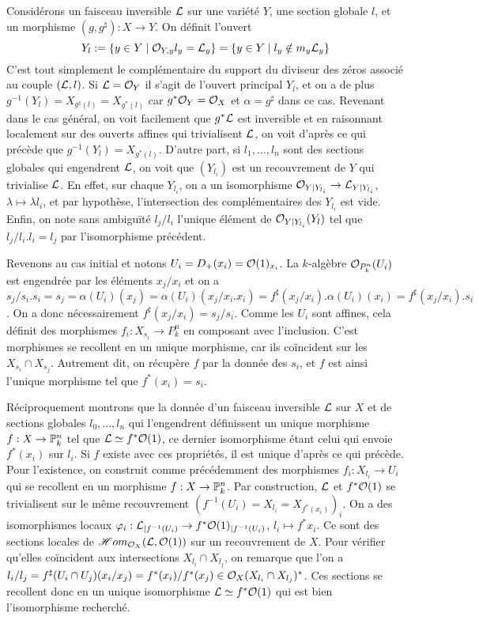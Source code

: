 Considérons un faisceau inversible $\mathcal{L}$ sur une variété $Y$, une section globale $l$, et un morphisme $(g,g^\sharp):X\rightarrow Y$. On définit l'ouvert 
$$Y_l:=\lbrace y\in Y\mid \mathcal{O}_{Y,y}l_y=\mathcal{L}_y\rbrace=\lbrace y\in Y\mid l_y\notin m_y\mathcal{L}_y\rbrace$$
C'est tout simplement le complémentaire du support du diviseur des zéros associé au couple $(\mathcal{L},l)$. Si $\mathcal{L}=\mathcal{O}_Y$ il s'agit de l'ouvert principal $Y_l$, et on a de plus $g^{-1}(Y_l)=X_{g^\sharp(l)}=X_{g^*(l)}$ car $g^*\mathcal{O}_Y=\mathcal{O}_X$ et $\alpha=g^\sharp$ dans ce cas. Revenant dans le cas général, on voit facilement que $g^*\mathcal{L}$ est inversible et en raisonnant localement sur des ouverts affines qui trivialisent $\mathcal{L}$, on voit d'après ce qui précède que $g^{-1}(Y_l)=X_{g^*(l)}$. D'autre part, si $l_1,...,l_n$ sont des sections globales qui engendrent $\mathcal{L}$, on voit que $(Y_{l_i})$ est un recouvrement de $Y$ qui trivialise $\mathcal{L}$. En effet, sur chaque $Y_{l_i}$, on a un isomorphisme $\mathcal{O}_{Y|Y_{l_i}}\rightarrow \mathcal{L}_{Y|Y_{l_i}}$, $\lambda \mapsto \lambda l_i$, et par hypothèse, l'intersection des complémentaires des $Y_{l_i}$ est vide. Enfin, on note sans ambiguïté $l_j/l_i$ l'unique élément de $\mathcal{O}_{Y|Y_{l_i}}(Y_l)$ tel que $l_j/l_i.l_i=l_j$ par l'isomorphisme précédent.

Revenons au cas initial et notons $U_i=D_+(x_i)=\mathcal{O}(1)_{x_i}$. La $k$-algèbre $\mathcal{O}_{P^n_k}(U_i)$ est engendrée par les éléments $x_j/x_i$ et on a $s_j/s_i.s_i=s_j=\alpha(U_i)(x_j)=\alpha(U_i)(x_j/x_i.x_i)=f^\sharp(x_j/x_i).\alpha(U_i)(x_i)=f^\sharp(x_j/x_i).s_i$. On a donc nécessairement $f^\sharp(x_j/x_i)=s_j/s_i$. Comme les $U_i$ sont affines, cela définit des morphismes $f_i:X_{s_i}\rightarrow P^n_k$ en composant avec l'inclusion. C'est morphismes se recollent en un unique morphisme, car ils coïncident sur les $X_{s_i}\cap X_{s_j}$. Autrement dit, on récupère $f$ par la donnée des $s_i$, et $f$ est ainsi l'unique morphisme tel que $f^*(x_i)=s_i$.

Réciproquement montrons que la donnée d'un faisceau inversible $\mathcal{L}$ sur $X$ et de sections globales $l_0,...,l_n$ qui l'engendrent définissent un unique morphisme $f:X\rightarrow \mathbb{P}^n_k$ tel que $\mathcal{L}\simeq f^*\mathcal{O}(1)$, ce dernier isomorphisme étant celui qui envoie $f^*(x_i)$ sur $l_i$. Si $f$ existe avec ces propriétés, il est unique d'après ce qui précède. Pour l'existence, on construit comme précédemment des morphismes $f_i:X_{l_i}\rightarrow U_i$ qui se recollent en un morphisme $f:X\rightarrow \mathbb{P}^n_k$. Par construction, $\mathcal{L}$ et $f^*\mathcal{O}(1)$ se trivialisent sur le même recouvrement $(f^{-1}(U_i)=X_{l_i}=X_{f^*(x_i)})_i$. On a des isomorphismes locaux $\varphi_i:\mathcal{L}_{|f^{-1}(U_i)}\rightarrow f^*\mathcal{O}(1)_{|f^{-1}(U_i)}$, $l_i\mapsto f^*x_i$. Ce sont des sections locales de $\mathscr{H}om_{\mathcal{O}_X}(\mathcal{L},\mathcal{O}(1))$ sur un recouvrement de $X$. Pour vérifier qu'elles coïncident aux intersections $X_{l_i}\cap X_{l_j}$, on remarque que l'on a $l_i/l_j=f^\sharp(U_i\cap U_j)(x_i/x_j)= f^*(x_i)/f^*(x_j)\in \mathcal{O}_X(X_{l_i}\cap X_{l_j})^*$. Ces sections se recollent donc en un unique isomorphisme $\mathcal{L}\simeq f^*\mathcal{O}(1)$ qui est bien l'isomorphisme recherché.


